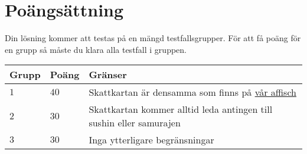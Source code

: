 \section*{Poängsättning}
Din lösning kommer att testas på en mängd testfallsgrupper.
För att få poäng för en grupp så måste du klara alla testfall i gruppen.

\noindent
\begin{tabular}{| l | l | p{12cm} |}
  \hline
  \textbf{Grupp} & \textbf{Poäng} & \textbf{Gränser} \\ \hline
  $1$    & $40$      & Skattkartan är densamma som finns på \href{https://www.progolymp.se/2018/affisch.pdf}{vår affisch} \\ \hline
  $2$    & $30$      & Skattkartan kommer alltid leda antingen till sushin eller samurajen \\ \hline
  $3$    & $30$      & Inga ytterligare begränsningar  \\ \hline
\end{tabular}
